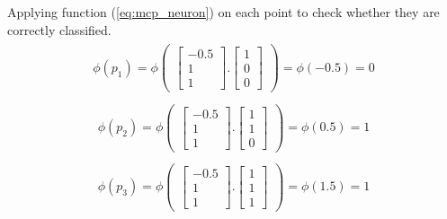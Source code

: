 Applying function (\ref{eq:mcp_neuron}) on each point to check whether they are correctly classified.
\begin{align}
  \nonumber
  \begin{matrix}
    \phi(p_1) = \phi\begin{pmatrix}
      \begin{bmatrix}
        -0.5 \\
        1 \\
        1 
      \end{bmatrix}.\begin{bmatrix}
        1 \\
        0 \\
        0
      \end{bmatrix}
    \end{pmatrix} = \phi(-0.5) = 0 
  \end{matrix}
\end{align}
\begin{align}
  \nonumber
  \begin{matrix}
    \phi(p_2) = \phi\begin{pmatrix}
      \begin{bmatrix}
        -0.5 \\
        1 \\
        1 
      \end{bmatrix}.\begin{bmatrix}
        1 \\
        1 \\
        0
      \end{bmatrix}
    \end{pmatrix} = \phi(0.5) = 1
  \end{matrix}
\end{align}
\begin{align}
  \nonumber
  \begin{matrix}
    \phi(p_3) = \phi\begin{pmatrix}
      \begin{bmatrix}
        -0.5 \\
        1 \\
        1 
      \end{bmatrix}.\begin{bmatrix}
        1 \\
        1 \\
        1
      \end{bmatrix}
    \end{pmatrix} = \phi(1.5) = 1
  \end{matrix}
\end{align}
